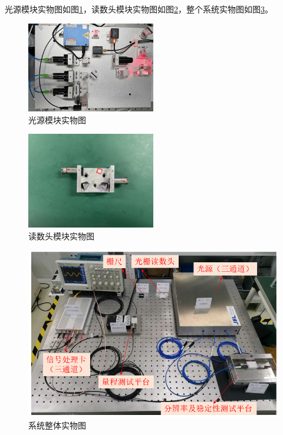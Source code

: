 \documentclass[type=master,oneside]{fduthesis}
\begin{document}
光源模块实物图如图\ref{fig:光源模块实物图}，读数头模块实物图如图\ref{fig:读数头模块实物图}，整个系统实物图如图\ref{fig:系统整体实物图}。
\begin{figure}[H]
  \centering
  \includegraphics[width=0.5\textwidth]{4-fig//光源模块实物图.png}
  \caption{光源模块实物图}
  \label{fig:光源模块实物图}
\end{figure}
\begin{figure}[H]
  \centering
  \includegraphics[width=0.5\textwidth]{4-fig//读数头模块实物图.jpg}
  \caption{读数头模块实物图}
  \label{fig:读数头模块实物图}
\end{figure}
\begin{figure}[H]
  \centering
  \includegraphics[width=1\textwidth]{4-fig//整体实验装置图.png}
  \caption{系统整体实物图}
  \label{fig:系统整体实物图}
\end{figure}
\end{document}
